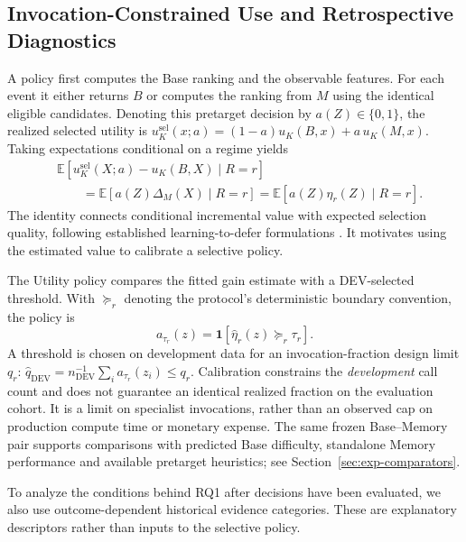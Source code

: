 \subsection{Invocation-Constrained Use and Retrospective Diagnostics}
\label{sec:decision-rule}
\label{sec:framework-controls}

A policy first computes the Base ranking and the observable features. For each event it either returns $B$ or computes the ranking from $M$ using the identical eligible candidates. Denoting this pretarget decision by $a(Z)\in\{0,1\}$, the realized selected utility is $u_K^{\mathrm{sel}}(x;a)=(1-a)u_K(B,x)+a\,u_K(M,x)$. Taking expectations conditional on a regime yields
\begin{align}
    &\mathbb{E}\!\left[u_K^{\mathrm{sel}}(X;a)-u_K(B,X)\mid R=r\right] \\
    &\qquad=\mathbb{E}\!\left[a(Z)\Delta_M(X)\mid R=r\right]
    =\mathbb{E}\!\left[a(Z)\eta_r(Z)\mid R=r\right].
    \label{eq:expected-selective-gain}
\end{align}
The identity connects conditional incremental value with expected selection quality, following established learning-to-defer formulations \cite{mozannar2020defer,narasimhan2022posthoc}. It motivates using the estimated value to calibrate a selective policy.

The Utility policy compares the fitted gain estimate with a DEV-selected threshold. With $\succeq_r$ denoting the protocol's deterministic boundary convention, the policy is
\begin{equation}
    a_{\tau_r}(z)=\mathbf{1}\!\left[
    \hat{\eta}_r(z)\mathrel{\succeq_r}\tau_r
    \right].
    \label{eq:utility-threshold}
\end{equation}
A threshold is chosen on development data for an invocation-fraction design limit $q_r$: $\hat q_{\mathrm{DEV}}=n_{\mathrm{DEV}}^{-1}\sum_i a_{\tau_r}(z_i)\le q_r$. Calibration constrains the \emph{development} call count and does not guarantee an identical realized fraction on the evaluation cohort. It is a limit on specialist invocations, rather than an observed cap on production compute time or monetary expense. The same frozen Base--Memory pair supports comparisons with predicted Base difficulty, standalone Memory performance and available pretarget heuristics; see Section~\ref{sec:exp-comparators}.

To analyze the conditions behind RQ1 after decisions have been evaluated, we also use outcome-dependent historical evidence categories. These are explanatory descriptors rather than inputs to the selective policy.

